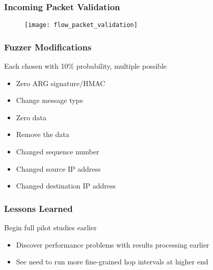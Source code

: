 \documentclass{beamer}
\begin{document}
\begin{frame}
	\frametitle{Incoming Packet Validation}
	\begin{figure}
	\texttt{[image: flow\_packet\_validation]}
	\end{figure}
\end{frame}

\begin{frame}
	\frametitle{Fuzzer Modifications}
	
	Each chosen with 10\% probability, multiple possible
	\begin{itemize}
	\item Zero ARG signature/HMAC
	\item Change message type
	\item Zero data
	\item Remove the data
	\item Changed sequence number
	\item Changed source IP address
	\item Changed destination IP address
	\end{itemize}
\end{frame}

\begin{frame}
	\frametitle{Lessons Learned}
	Begin full pilot studies earlier
	\begin{itemize}
	\item Discover performance problems with results processing earlier
	\item See need to run more fine-grained hop intervals at higher end
	\end{itemize}
\end{frame}
\end{document}
